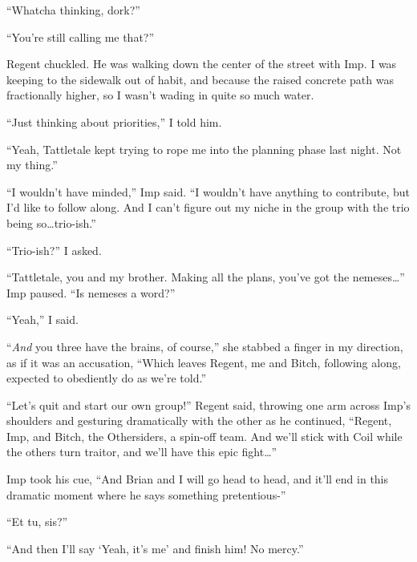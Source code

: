 ``Whatcha thinking, dork?''



``You're still calling me that?''



Regent chuckled.  He was walking down the center of the street with Imp.  I was keeping to the sidewalk out of habit, and because the raised concrete path was fractionally higher, so I wasn't wading in quite so much water.



``Just thinking about priorities,'' I told him.



``Yeah, Tattletale kept trying to rope me into the planning phase last night.  Not my thing.''



``I wouldn't have minded,'' Imp said.  ``I wouldn't have anything to contribute, but I'd like to follow along.  And I can't figure out my niche in the group with the trio being so\ldots trio-ish.''



``Trio-ish?'' I asked.



``Tattletale, you and my brother.  Making all the plans, you've got the nemeses\ldots'' Imp paused.  ``Is nemeses a word?''



``Yeah,'' I said.



``\emph{And} you three have the brains, of course,'' she stabbed a finger in my direction, as if it was an accusation, ``Which leaves Regent, me and Bitch, following along, expected to obediently do as we're told.''



``Let's quit and start our own group!''  Regent said, throwing one arm across Imp's shoulders and gesturing dramatically with the other as he continued, ``Regent, Imp, and Bitch, the Othersiders, a spin-off team.  And we'll stick with Coil while the others turn traitor, and we'll have this epic fight\ldots''



Imp took his cue, ``And Brian and I will go head to head, and it'll end in this dramatic moment where he says something pretentious-''



``Et tu, sis?''



``And then I'll say `Yeah, it's me' and finish him!  No mercy.''



